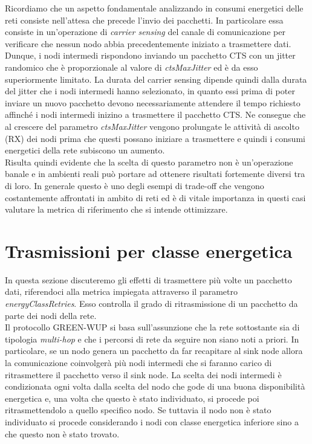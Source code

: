\documentclass[binding=0.6cm,TFA]{sapthesis}
\begin{document}
Ricordiamo che un aspetto fondamentale analizzando in consumi energetici delle reti consiste nell'attesa che precede l'invio dei pacchetti. In particolare essa
consiste in un'operazione di \emph{carrier sensing} del canale di comunicazione per verificare che nessun nodo abbia precedentemente iniziato a trasmettere dati.
Dunque, i nodi intermedi rispondono inviando un pacchetto CTS con un jitter randomico che è proporzionale al valore di \emph{ctsMaxJitter} ed è da esso superiormente
limitato. La durata del carrier sensing dipende quindi dalla durata del jitter che i nodi intermedi hanno selezionato, in quanto essi prima di poter inviare un nuovo
pacchetto devono necessariamente attendere il tempo richiesto affinché i nodi intermedi inizino a trasmettere il pacchetto CTS. Ne consegue che al crescere del
parametro \emph{ctsMaxJitter} vengono prolungate le attività di ascolto (RX) dei nodi prima che questi possano iniziare a trasmettere e quindi i consumi energetici
della rete subiscono un aumento.\\

\newpage
Risulta quindi evidente che la scelta di questo parametro non è un'operazione banale e in ambienti reali può portare ad ottenere risultati fortemente diversi tra di loro.
In generale questo è uno degli esempi di trade-off che vengono costantemente affrontati in ambito di reti ed è di vitale importanza in questi casi valutare
la metrica di riferimento che si intende ottimizzare.

\section{Trasmissioni per classe energetica}

In questa sezione discuteremo gli effetti di trasmettere più volte un pacchetto dati, riferendoci alla metrica impiegata attraverso il parametro
\emph{energyClassRetries}. Esso controlla il grado di ritrasmissione di un pacchetto da parte dei nodi della rete.\\

Il protocollo GREEN-WUP si basa sull'assunzione che la rete sottostante sia di tipologia \emph{multi-hop} e che i percorsi di rete da seguire non siano noti a priori.
In particolare, se un nodo genera un pacchetto da far recapitare al sink node allora la comunicazione coinvolgerà più nodi intermedi che si faranno
carico di ritrasmettere il pacchetto verso il sink node. La scelta dei nodi intermedi è condizionata ogni volta dalla scelta del nodo che gode
di una buona disponibilità energetica e, una volta che questo è stato individuato, si procede poi ritrasmettendolo a quello specifico nodo. Se tuttavia
il nodo non è stato individuato si procede considerando i nodi con classe energetica inferiore sino a che questo non è stato trovato. \\
\end{document}

